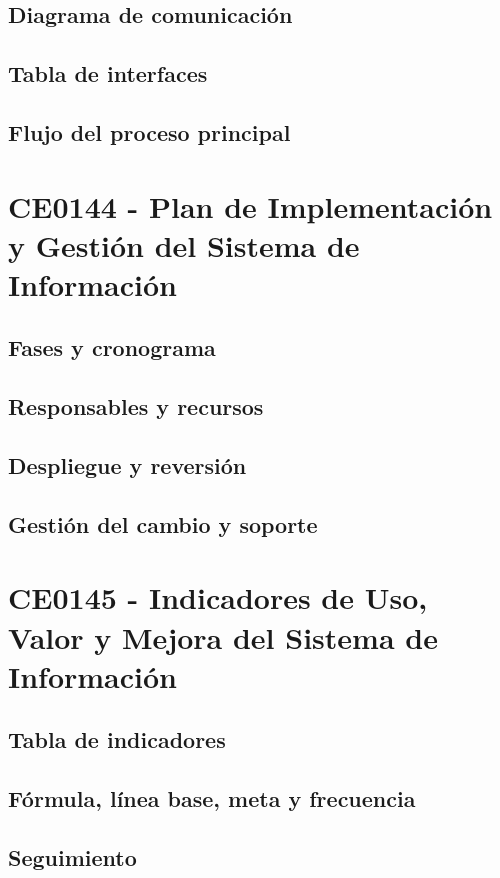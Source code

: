 \section{Diagrama de comunicación}
\section{Tabla de interfaces}
\section{Flujo del proceso principal}

\chapter{CE0144 - Plan de Implementación y Gestión del Sistema de Información}

\section{Fases y cronograma}
\section{Responsables y recursos}
\section{Despliegue y reversión}
\section{Gestión del cambio y soporte}

\chapter{CE0145 - Indicadores de Uso, Valor y Mejora del Sistema de Información}

\section{Tabla de indicadores}
\section{Fórmula, línea base, meta y frecuencia}
\section{Seguimiento}
